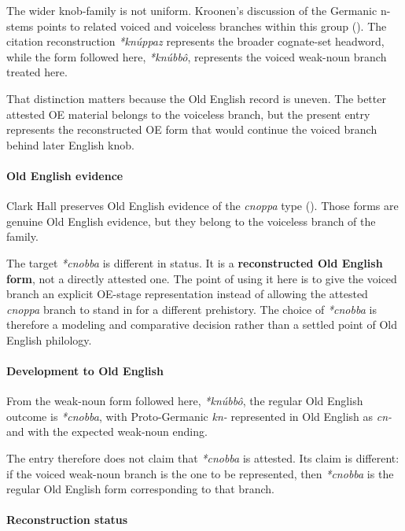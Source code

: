 \documentclass[
  british,
  a4paper,
]{article}
\begin{document}
The wider knob-family is not uniform. Kroonen's discussion of the
Germanic n-stems points to related voiced and voiceless branches within
this group (). The citation
reconstruction \emph{*knúppaz} represents the broader cognate-set
headword, while the form followed here, \emph{*knúbbô}, represents the
voiced weak-noun branch treated here.

That distinction matters because the Old English record is uneven. The
better attested OE material belongs to the voiceless branch, but the
present entry represents the reconstructed OE form that would continue
the voiced branch behind later English knob.

\paragraph{Old English evidence}\label{old-english-evidence-67}

Clark Hall preserves Old English evidence of the \emph{cnoppa} type
(). Those forms are
genuine Old English evidence, but they belong to the voiceless branch of
the family.

The target \emph{*cnobba} is different in status. It is a
\textbf{reconstructed Old English form}, not a directly attested one.
The point of using it here is to give the voiced branch an explicit
OE-stage representation instead of allowing the attested \emph{cnoppa}
branch to stand in for a different prehistory. The choice of
\emph{*cnobba} is therefore a modeling and comparative decision rather
than a settled point of Old English philology.

\paragraph{Development to Old
English}\label{development-to-old-english-67}

From the weak-noun form followed here, \emph{*knúbbô}, the regular Old
English outcome is \emph{*cnobba}, with Proto-Germanic \emph{kn-}
represented in Old English as \emph{cn-} and with the expected weak-noun
ending.

The entry therefore does not claim that \emph{*cnobba} is attested. Its
claim is different: if the voiced weak-noun branch is the one to be
represented, then \emph{*cnobba} is the regular Old English form
corresponding to that branch.

\paragraph{Reconstruction status}\label{reconstruction-status}
\end{document}
